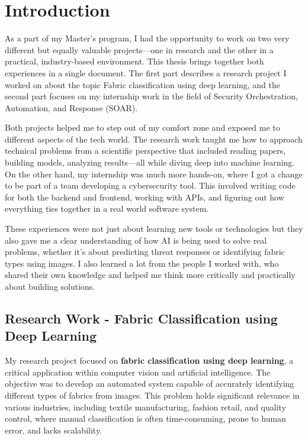 \chapter{Introduction}

As a part of my Master’s program, I had the opportunity to work on two very different but equally valuable projects—one in research and the other in a practical, industry-based environment. This thesis brings together both experiences in a single document. The first part describes a research project I worked on about the topic Fabric classification using deep learning, and the second part focuses on my internship work in the field of Security Orchestration, Automation, and Response (SOAR).

Both projects helped me to step out of my comfort zone and exposed me to different aspects of the tech world. The research work taught me how to approach technical problems from a scientific perspective that included reading papers, building models, analyzing results—all while diving deep into machine learning. On the other hand, my internship was much more hands-on, where I got a change to be part of a team developing a cybersecurity tool. This involved writing code for both the backend and frontend, working with APIs, and figuring out how everything ties together in a real world software system.

These experiences were not just about learning new tools or technologies but they also gave me a clear understanding of how AI is being used to solve real problems, whether it’s about predicting threat responses or identifying fabric types using images. I also learned a lot from the people I worked with, who shared their own knowledge and helped me think more critically and practically about building solutions.

\section{Research Work - Fabric Classification using Deep Learning}

My research project focused on \textbf{fabric classification using deep learning}, a critical application within computer vision and artificial intelligence. The objective was to develop an automated system capable of accurately identifying different types of fabrics from images. This problem holds significant relevance in various industries, including textile manufacturing, fashion retail, and quality control, where manual classification is often time-consuming, prone to human error, and lacks scalability.


